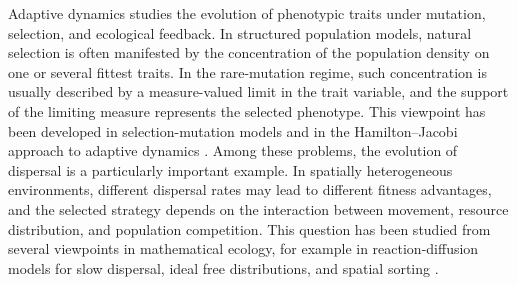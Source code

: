 \documentclass[11pt]{article}
\numberwithin{equation}{section}
\begin{document}
Adaptive dynamics studies the evolution of phenotypic traits under mutation, selection, and ecological feedback. In structured population models, natural selection is often manifested by the concentration of the population density on one or several fittest traits. In the rare-mutation regime, such concentration is usually described by a measure-valued limit in the trait variable, and the support of the limiting measure represents the selected phenotype. This viewpoint has been developed in selection-mutation models and in the Hamilton--Jacobi approach to adaptive dynamics \cite{BarlesPerthame, DiekmannJabinMischlerPerthame}. Among these problems, the evolution of dispersal is a particularly important example. In spatially heterogeneous environments, different dispersal rates may lead to different fitness advantages, and the selected strategy depends on the interaction between movement, resource distribution, and population competition. This question has been studied from several viewpoints in mathematical ecology, for example in reaction-diffusion models for slow dispersal, ideal free distributions, and spatial sorting \cite{DockeryHutsonMischaikowPernarowski1998, Hastings1983,Ronce2007}.
\end{document}
